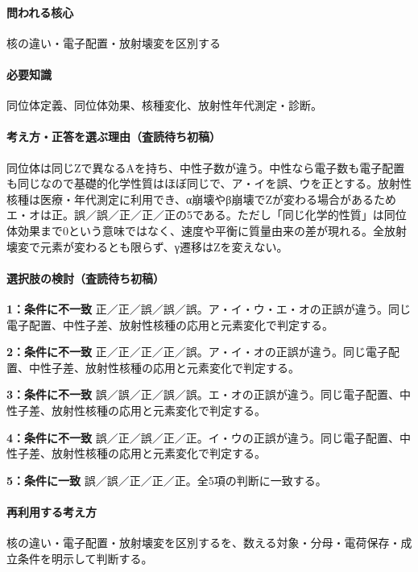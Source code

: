 \paragraph{問われる核心} 核の違い・電子配置・放射壊変を区別する

\paragraph{必要知識} 同位体定義、同位体効果、核種変化、放射性年代測定・診断。

\paragraph{考え方・正答を選ぶ理由（査読待ち初稿）} 同位体は同じZで異なるAを持ち、中性子数が違う。中性なら電子数も電子配置も同じなので基礎的化学性質はほぼ同じで、ア・イを誤、ウを正とする。放射性核種は医療・年代測定に利用でき、α崩壊やβ崩壊でZが変わる場合があるためエ・オは正。誤／誤／正／正／正の5である。ただし「同じ化学的性質」は同位体効果まで0という意味ではなく、速度や平衡に質量由来の差が現れる。全放射壊変で元素が変わるとも限らず、γ遷移はZを変えない。

\paragraph{選択肢の検討（査読待ち初稿）}\mbox{}\par

\noindent\textbf{1：条件に不一致} 正／正／誤／誤／誤。ア・イ・ウ・エ・オの正誤が違う。同じ電子配置、中性子差、放射性核種の応用と元素変化で判定する。\par

\noindent\textbf{2：条件に不一致} 正／正／正／正／誤。ア・イ・オの正誤が違う。同じ電子配置、中性子差、放射性核種の応用と元素変化で判定する。\par

\noindent\textbf{3：条件に不一致} 誤／誤／正／誤／誤。エ・オの正誤が違う。同じ電子配置、中性子差、放射性核種の応用と元素変化で判定する。\par

\noindent\textbf{4：条件に不一致} 誤／正／誤／正／正。イ・ウの正誤が違う。同じ電子配置、中性子差、放射性核種の応用と元素変化で判定する。\par

\noindent\textbf{5：条件に一致} 誤／誤／正／正／正。全5項の判断に一致する。\par

\paragraph{再利用する考え方} 核の違い・電子配置・放射壊変を区別するを、数える対象・分母・電荷保存・成立条件を明示して判断する。

